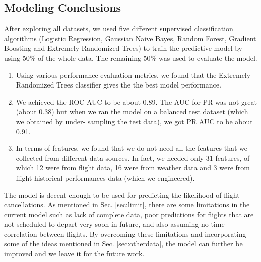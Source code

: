 \documentclass[12pt]{article}
\begin{document}
\subsection{Modeling Conclusions}
After exploring all datasets, we used five different supervised classification algorithms (Logistic Regression, Gaussian Naive Bayes, Random Forest, Gradient Boosting and Extremely Randomized Trees) to train the predictive model by using 50$\%$ of the whole data. The remaining 50$\%$ was used to evaluate the model. 
\begin{enumerate}
\item Using various performance evaluation metrics, we found that the Extremely Randomized Trees classifier gives the the best model performance. 
\item We achieved the ROC AUC to be about 0.89. The AUC for PR was not great (about 0.38) but when we ran the model on a balanced test dataset (which we obtained by under- sampling the test data), we got PR AUC to be about 0.91. 
\item In terms of features, we found that we do not need all the features that we collected from different data sources. In fact, we needed only 31 features, of which 12 were from flight data, 16 were from weather data and 3 were from flight historical performances data (which we engineered). 
\end{enumerate}
The model is decent enough to be used for predicting the likelihood of flight cancellations. As mentioned in Sec. \ref{sec:limit}, there are some limitations in the current model such as lack of complete data, poor predictions for flights that are not scheduled to depart very soon in future, and also assuming no time-correlation between flights. By overcoming these limitations and incorporating some of the ideas mentioned in Sec. \ref{sec:otherdata}, the model can further be improved and we leave it for the future work.    
\end{document}
